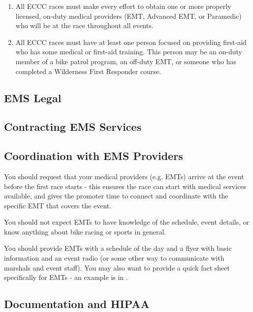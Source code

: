 \documentclass[
  letterpaper, %
  fontsize=10pt, %
  twoside=true,
  chapterentrydots=true, %
  numbers=noenddot,
  fontmethod=tex,
]{kaobook}
\begin{document}

\begin{regulation}[
  ref=medical,
  title=Required Medical Services at ECCC Races,
  draft=true
]
\begin{enumerate}[label=\Alph*.]
  \item
    All ECCC races must make every effort to obtain one or more
    properly licensed, on-duty medical providers (EMT, Advanced EMT, or Paramedic)
    who will be at the race throughout all events.
  \item
    All ECCC races must have at least one person focused on providing first-aid who has some medical or first-aid training.
    This person may be an on-duty member of a bike patrol program, an off-duty EMT, or someone who has completed a Wilderness First Responder course.
\end{enumerate}
\end{regulation}

\subsection{EMS Legal}

\subsection[Contracting]{Contracting EMS Services}

\subsection[EMS Coordination]{Coordination with EMS Providers}

You should request that your medical providers (e.g. EMTs)
arrive at the event before the first race starts -
this ensures the race can start with medical services available,
and gives the promoter time to connect and coordinate with the specific EMT
that covers the event.

You should not expect EMTs to have knowledge of the schedule, event details, or
know anything about bike racing or sports in general.

You should provide EMTs with a schedule of the day and a flyer with basic information
and an event radio (or some other way to communicate with marshals and event staff).
You may also want to provide a quick fact sheet specifically for EMTs - an example is in
.

\subsection{Documentation and HIPAA}
\end{document}

